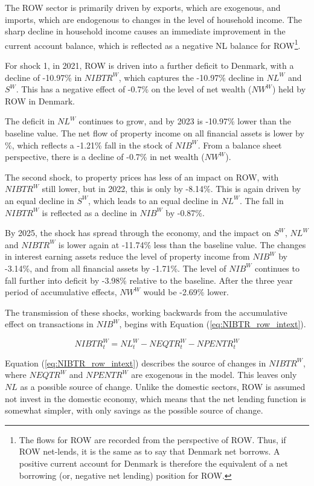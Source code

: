 \documentclass[
]{book}
\begin{document}
The ROW sector is primarily driven by exports, which are exogenous, and imports, which are endogenous to changes in the level of household income. The sharp decline in household income causes an immediate improvement in the current account balance, which is reflected as a negative NL balance for ROW\footnote{The flows for ROW are recorded from the perspective of ROW. Thus, if ROW net-lends, it is the same as to say that Denmark net borrows. A positive current account for Denmark is therefore the equivalent of a net borrowing (or, negative net lending) position for ROW.}.

For shock 1, in 2021, ROW is driven into a further deficit to Denmark, with a decline of -10.97\% in \(NIBTR^W\), which captures the -10.97\% decline in \(NL^W\) and \(S^W\). This has a negative effect of -0.7\% on the level of net wealth (\(NW^W\)) held by ROW in Denmark.

The deficit in \(NL^W\) continues to grow, and by 2023 is -10.97\% lower than the baseline value. The net flow of property income on all financial assets is lower by \%, which reflects a -1.21\% fall in the stock of \(NIB^W\). From a balance sheet perspective, there is a decline of -0.7\% in net wealth (\(NW^W\)).

The second shock, to property prices has less of an impact on ROW, with \(NIBTR^W\) still lower, but in 2022, this is only by -8.14\%. This is again driven by an equal decline in \(S^W\), which leads to an equal decline in \(NL^W\). The fall in \(NIBTR^W\) is reflected as a decline in \(NIB^W\) by -0.87\%.

By 2025, the shock has spread through the economy, and the impact on \(S^W\), \(NL^W\) and \(NIBTR^W\) is lower again at -11.74\% less than the baseline value. The changes in interest earning assets reduce the level of property income from \(NIB^W\) by -3.14\%, and from all financial assets by -1.71\%. The level of \(NIB^W\) continues to fall further into deficit by -3.98\% relative to the baseline. After the three year period of accumulative effects, \(NW^W\) would be -2.69\% lower.

The transmission of these shocks, working backwards from the accumulative effect on transactions in \(NIB^W\), begins with Equation (\ref{eq:NIBTR_row_intext}).

\begin{equation}
NIBTR^W_t = NL^W_t - NEQTR^W_t - NPENTR^W_t
\label{eq:NIBTR_row_intext}
\end{equation}

Equation (\ref{eq:NIBTR_row_intext}) describes the source of changes in \(NIBTR^W\), where \(NEQTR^W\) and \(NPENTR^W\) are exogenous in the model. This leaves only \(NL\) as a possible source of change. Unlike the domestic sectors, ROW is assumed not invest in the domestic economy, which means that the net lending function is somewhat simpler, with only savings as the possible source of change.
\end{document}

